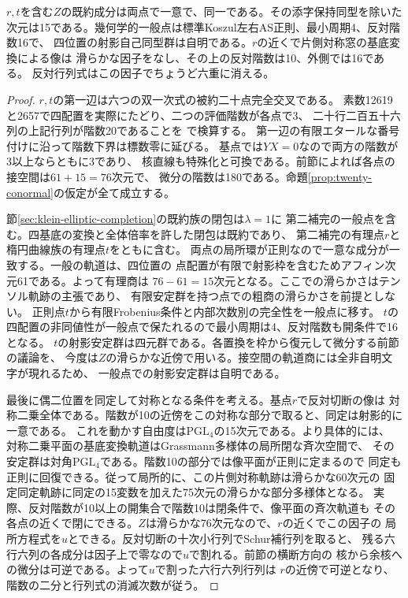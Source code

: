 \begin{theorem}\label{thm:full-fifteen-component}
$r,t$を含む$Z$の既約成分は両点で一意で、同一である。その添字保持同型を除いた
次元は15である。幾何学的一般点は標準Koszul左右AS正則、最小周期4、反対階数16で、
四位置の射影自己同型群は自明である。$r$の近くで片側対称窓の基底変換による像は
滑らかな因子をなし、その上の反対階数は10、外側では16である。
反対行列式はこの因子でちょうど六重に消える。
\end{theorem}
\begin{proof}
$r,t$の第一辺は六つの双一次式の被約二十点完全交叉である。
素数12619と2657で四配置を実際にたどり、二つの評価階数が各点で3、
二十行二百五十六列の上記行列が階数20であることを
で検算する。
第一辺の有限エタールな番号付けに沿って階数下界は標数零に延びる。
基点では$YX=0$なので両方の階数が3以上ならともに3であり、
核直線も特殊化と可換である。前節によれば各点の接空間は$61+15=76$次元で、
微分の階数は180である。命題\ref{prop:twenty-conormal}の仮定が全て成立する。

節\ref{sec:klein-elliptic-completion}の既約族の閉包は$\lambda=1$に
第二補完の一般点を含む。四基底の変換と全体倍率を許した閉包は既約であり、
第二補完の有理点$r$と楕円曲線族の有理点$t$をともに含む。
両点の局所環が正則なので一意な成分が一致する。一般の軌道は、四位置の
点配置が有限で射影枠を含むためアフィン次元61である。よって有理商は
$76-61=15$次元となる。ここでの滑らかさはテンソル軌跡の主張であり、
有限安定群を持つ点での粗商の滑らかさを前提としない。
正則点$t$から有限Frobenius条件と内部次数別の完全性を一般点に移す。
$t$の四配置の非同値性が一般点で保たれるので最小周期は4、反対階数も開条件で16となる。
$t$の射影安定群は四元群である。各置換を枠から復元して微分する前節の議論を、
今度は$Z$の滑らかな近傍で用いる。接空間の軌道商には全非自明文字が現れるため、
一般点での射影安定群は自明である。

最後に偶二位置を同定して対称となる条件を考える。基点$r$で反対切断の像は
対称二乗全体である。階数が10の近傍をこの対称な部分で取ると、同定は射影的に一意である。
これを動かす自由度は$\mathrm{PGL}_4$の15次元である。より具体的には、
対称二乗平面の基底変換軌道はGrassmann多様体の局所閉な斉次空間で、
その安定群は対角$\mathrm{PGL}_4$である。階数10の部分では像平面が正則に定まるので
同定も正則に回復できる。従って局所的に、この片側対称軌跡は滑らかな60次元の
固定同定軌跡に同定の15変数を加えた75次元の滑らかな部分多様体となる。
実際、反対階数が10以上の開集合で階数10は閉条件で、像平面の斉次軌道も
その各点の近くで閉にできる。$Z$は滑らかな76次元なので、$r$の近くでこの因子の
局所方程式を$u$とできる。反対切断の十次小行列でSchur補行列を取ると、
残る六行六列の各成分は因子上で零なので$u$で割れる。前節の横断方向の
核から余核への微分は可逆である。よって$u$で割った六行六列行列は
$r$の近傍で可逆となり、階数の二分と行列式の消滅次数が従う。
\end{proof}
